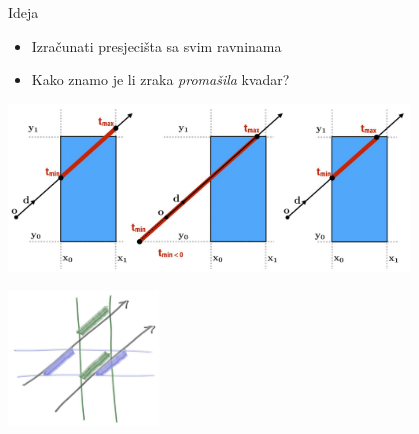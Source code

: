 \documentclass[9pt]{beamer}
\begin{document}
\begin{frame}{Ideja}
	\begin{itemize}
		\item Izračunati presjecišta sa svim ravninama
		\item Kako znamo je li zraka \textit{promašila} kvadar?
	\end{itemize}
	\begin{center}
		\includegraphics[width=0.8\textwidth]{slike/slide_007.jpg}
	\end{center}
\begin{center}
	\includegraphics[width=0.3\textwidth]{slike/fig.rstio.jpg}
\end{center}
\end{frame}
\end{document}
